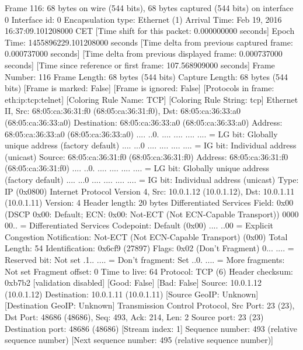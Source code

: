 Frame 116: 68 bytes on wire (544 bits), 68 bytes captured (544 bits) on interface 0
    Interface id: 0
    Encapsulation type: Ethernet (1)
    Arrival Time: Feb 19, 2016 16:37:09.101208000 CET
    [Time shift for this packet: 0.000000000 seconds]
    Epoch Time: 1455896229.101208000 seconds
    [Time delta from previous captured frame: 0.000737000 seconds]
    [Time delta from previous displayed frame: 0.000737000 seconds]
    [Time since reference or first frame: 107.568909000 seconds]
    Frame Number: 116
    Frame Length: 68 bytes (544 bits)
    Capture Length: 68 bytes (544 bits)
    [Frame is marked: False]
    [Frame is ignored: False]
    [Protocols in frame: eth:ip:tcp:telnet]
    [Coloring Rule Name: TCP]
    [Coloring Rule String: tcp]
Ethernet II, Src: 68:05:ca:36:31:f0 (68:05:ca:36:31:f0), Dst: 68:05:ca:36:33:a0 (68:05:ca:36:33:a0)
    Destination: 68:05:ca:36:33:a0 (68:05:ca:36:33:a0)
        Address: 68:05:ca:36:33:a0 (68:05:ca:36:33:a0)
        .... ..0. .... .... .... .... = LG bit: Globally unique address (factory default)
        .... ...0 .... .... .... .... = IG bit: Individual address (unicast)
    Source: 68:05:ca:36:31:f0 (68:05:ca:36:31:f0)
        Address: 68:05:ca:36:31:f0 (68:05:ca:36:31:f0)
        .... ..0. .... .... .... .... = LG bit: Globally unique address (factory default)
        .... ...0 .... .... .... .... = IG bit: Individual address (unicast)
    Type: IP (0x0800)
Internet Protocol Version 4, Src: 10.0.1.12 (10.0.1.12), Dst: 10.0.1.11 (10.0.1.11)
    Version: 4
    Header length: 20 bytes
    Differentiated Services Field: 0x00 (DSCP 0x00: Default; ECN: 0x00: Not-ECT (Not ECN-Capable Transport))
        0000 00.. = Differentiated Services Codepoint: Default (0x00)
        .... ..00 = Explicit Congestion Notification: Not-ECT (Not ECN-Capable Transport) (0x00)
    Total Length: 54
    Identification: 0x6cf9 (27897)
    Flags: 0x02 (Don't Fragment)
        0... .... = Reserved bit: Not set
        .1.. .... = Don't fragment: Set
        ..0. .... = More fragments: Not set
    Fragment offset: 0
    Time to live: 64
    Protocol: TCP (6)
    Header checksum: 0xb7b2 [validation disabled]
        [Good: False]
        [Bad: False]
    Source: 10.0.1.12 (10.0.1.12)
    Destination: 10.0.1.11 (10.0.1.11)
    [Source GeoIP: Unknown]
    [Destination GeoIP: Unknown]
Transmission Control Protocol, Src Port: 23 (23), Dst Port: 48686 (48686), Seq: 493, Ack: 214, Len: 2
    Source port: 23 (23)
    Destination port: 48686 (48686)
    [Stream index: 1]
    Sequence number: 493    (relative sequence number)
    [Next sequence number: 495    (relative sequence number)]

